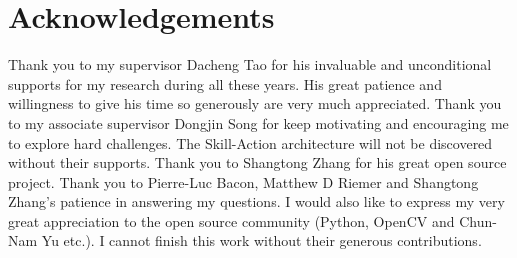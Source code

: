 
\section*{\hfil Acknowledgements \hfil}

Thank you to my supervisor Dacheng Tao for his invaluable and
unconditional supports for my research during all these years.
His great patience and willingness to give his time so generously
are very much appreciated. Thank you to my associate supervisor
Dongjin Song for keep motivating and encouraging me to explore
hard challenges. The Skill-Action architecture will not be
discovered without their supports. Thank you to Shangtong Zhang
for his great open source project. Thank you to Pierre-Luc Bacon,
Matthew D Riemer and Shangtong Zhang's patience in answering my
questions. I would also like to express my very great
appreciation to the open source community (Python, OpenCV and
Chun-Nam Yu etc.). I cannot finish this work without their
generous contributions.


